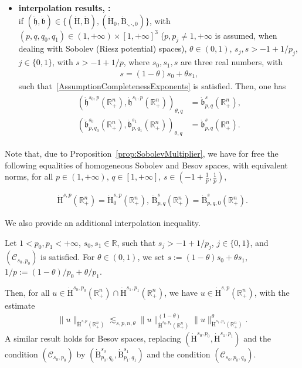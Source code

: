\documentclass[AHL,Unicode,longabstracts,published]{cedram}
\newcommand{\bbR}{\mathbb{R}}
\newcommand{\rmH}{\mathrm{H}}%
\newcommand{\rmB}{\mathrm{B}}
\newcommand{\clC}{\mathcal{C}}
\newcommand{\fkh}{\mathfrak{h}}
\newcommand{\fkb}{\mathfrak{b}}
\begin{document}
\begin{itemize}
\item \textbf{interpolation results, \cite[Propositions~3.17~\&~3.22]{Gaudin2022}:} \\
if $(\dot{\fkh},\dot{\fkb})\in\{(\dot{\rmH},\dot{\rmB}), (\dot{\rmH}_0,\dot{\rmB}_{\cdot,\cdot,0})\}$, with $(p,q,q_0,q_1)\in(1,+\infty)\times[1,+\infty]^3$ ($p,p_j\neq 1,+\infty$ is assumed, when dealing with Sobolev (Riesz potential) spaces), $\theta\in(0,1)$, $s_j,s>-1+1/p_j$, $j\in\{0,1\}$, with $s>-1+1/p$, where $s_0,s_1,s$ are three real numbers, with
\begin{align*}
s= (1-\theta)s_0+ \theta s_1,
\end{align*}
such that~\eqref{AssumptionCompletenessExponents} is satisfied. Then, one has
\begin{align}
\begin{split}
\left(\dot{\fkh}^{s_0,p}\left(\bbR^n_+\right),\dot{\fkh}^{s_1,p}\left(\bbR^n_+\right)\right)_{\theta,q}&= \dot{\fkb}^{s}_{p,q}\left(\bbR^n_+\right), \\
 \left(\dot{\fkb}^{s_0}_{p,q_0}\left(\bbR^n_+\right),\dot{\fkb}^{s_1}_{p,q_1}\left(\bbR^n_+\right)\right)_{\theta,q} &= \dot{\fkb}^{s}_{p,q}\left(\bbR^n_+\right).
\end{split}
\end{align}
\end{itemize}

Note that, due to Proposition~\ref{prop:SobolevMultiplier}, we have for free the following equalities of homogeneous Sobolev and Besov spaces, with equivalent norms, for all $p\in(1,+\infty)$, $q\in[1,+\infty]$, $s\in(-1+\frac{1}{p},\frac{1}{p})$,

\begin{align}
\dot{\rmH}^{s,p}\left(\bbR^n_+\right) = \dot{\rmH}^{s,p}_0\left(\bbR^n_+\right), \, \dot{\rmB}^{s}_{p,q}\left(\bbR^n_+\right)=\dot{\rmB}^{s}_{p,q,0}\left(\bbR^n_+\right) .
\end{align}

We also provide an additional interpolation inequality.

\begin{lemm}\label{lem:interpIneqRn+}
Let $1<p_0,p_1<+\infty$, $s_0,s_1\in\bbR$, such that $s_j>-1+1/p_j$, $j\in\{0,1\}$, and $(\clC_{s_0,p_0})$ is satisfied. For $\theta\in(0,1)$, we set $s:=(1-\theta)s_0+\theta s_1$, $1/p:=(1-\theta)/p_0+\theta/p_1$.

Then, for all $u\in \dot{\rmH}^{s_0,p_0}(\bbR^n_+)\cap\dot{\rmH}^{s_1,p_1}(\bbR^n_+)$, we have $u\in \dot{\rmH}^{s,p}(\bbR^n_+)$, with the estimate
\begin{align*}
\| u \|_{\dot{\rmH}^{s,p}\left(\bbR^n_+\right)} \lesssim_{s,p,n,\theta} \| u \|_{\dot{\rmH}^{s_0,p_0}\left(\bbR^n_+\right)}^{(1-\theta)}\| u \|_{\dot{\rmH}^{s_1,p_1}\left(\bbR^n_+\right)}^{\theta}.
\end{align*}
A similar result holds for Besov spaces, replacing $(\dot{\rmH}^{s_0,p_0},\dot{\rmH}^{s_1,p_1})$ and the condition $(\clC_{s_0,p_0})$ by $(\dot{\rmB}^{s_0}_{p_0,q_0},\dot{\rmB}^{s_1}_{p_1,q_1})$ and the condition $(\clC_{s_0,p_0,q_0})$.
\end{lemm}
\end{document}
